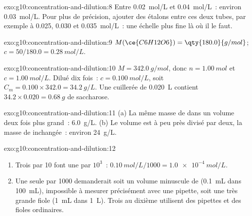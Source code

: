 \begin{solution}{exo:g10:concentration-and-dilution:8}
Entre \qty{0.02}{mol/L} et \qty{0.04}{mol/L}~: environ
\qty{0.03}{mol/L}. Pour plus de précision, ajouter des étalons entre ces
deux tubes, par exemple à 0.025, 0.030 et \qty{0.035}{mol/L}~: une
échelle plus fine là où il le faut.
\end{solution}

\begin{solution}{exo:g10:concentration-and-dilution:9}
$M(\ce{C6H12O6}) = \qty{180.0}{g/mol}$; $c = 50 / 180.0 =
\qty{0.28}{mol/L}$.
\end{solution}

\begin{solution}{exo:g10:concentration-and-dilution:10}
$M = \qty{342.0}{g/mol}$, donc $n = \qty{1.00}{mol}$ et $c =
\qty{1.00}{mol/L}$. Dilué dix fois~: $c = \qty{0.100}{mol/L}$, soit
$C_m = 0.100 \times 342.0 = \qty{34.2}{g/L}$. Une cuillerée de
\qty{0.020}{L} contient $34.2 \times 0.020 = \qty{0.68}{g}$ de
saccharose.
\end{solution}

\begin{solution}{exo:g10:concentration-and-dilution:11}
(a) La même masse de  dans un volume deux fois plus grand~:
\qty{6.0}{g/L}. (b) Le volume est à peu près divisé par deux, la masse
de  inchangée~: environ \qty{24}{g/L}.
\end{solution}

\begin{solution}{exo:g10:concentration-and-dilution:12}
\begin{enumerate}
  \item Trois  par 10 font une  par $10^3$~:
        $\qty{0.10}{mol/L} / 1000 = \qty{1.0e-4}{mol/L}$.
  \item Une seule  par 1000 demanderait soit un volume minuscule
        de  (\qty{0.1}{mL} dans \qty{100}{mL}), impossible à
        mesurer précisément avec une pipette, soit une très grande fiole
        (\qty{1}{mL} dans \qty{1}{L}). Trois  au dixième
        utilisent des pipettes et des fioles ordinaires.
\end{enumerate}
\end{solution}

